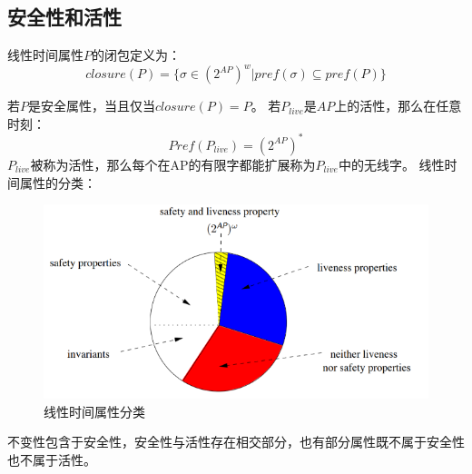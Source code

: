 \subsection{安全性和活性}
\begin{definition}[Closure]
线性时间属性$P$的闭包定义为：
$$
closure(P) = \{ \sigma \in (2^{AP})^{w} \vert  pref(\sigma) \subseteq pref(P)\}
$$
\end{definition}
若$P$是安全属性，当且仅当$closure(P) = P$。
若$P_{live}$是$AP$上的活性，那么在任意时刻：
$$
Pref(P_{live}) = (2^{AP})^{*}
$$
$P_{live}$被称为活性，那么每个在AP的有限字都能扩展称为$P_{live}$中的无线字。
线性时间属性的分类：
\begin{figure}
\centering %
\includegraphics[scale = 0.5]{./automaton/figures/LTProperty.png} %
\caption{线性时间属性分类} %
\end{figure}
不变性包含于安全性，安全性与活性存在相交部分，也有部分属性既不属于安全性也不属于活性。


